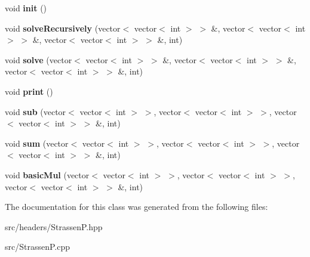 \begin{DoxyCompactItemize}
\item 
\hypertarget{classStrassenP_aecdf8438ab2f8d1cf16e184f3b0911a2}{void {\bfseries init} ()}\label{classStrassenP_aecdf8438ab2f8d1cf16e184f3b0911a2}

\item 
\hypertarget{classStrassenP_afaadbd17121fbaa8884e951a10c82fba}{void {\bfseries solve\-Recursively} (vector$<$ vector$<$ int $>$ $>$ \&, vector$<$ vector$<$ int $>$ $>$ \&, vector$<$ vector$<$ int $>$ $>$ \&, int)}\label{classStrassenP_afaadbd17121fbaa8884e951a10c82fba}

\item 
\hypertarget{classStrassenP_aa1f4f752c28183d6310fb0a18d20533a}{void {\bfseries solve} (vector$<$ vector$<$ int $>$ $>$ \&, vector$<$ vector$<$ int $>$ $>$ \&, vector$<$ vector$<$ int $>$ $>$ \&, int)}\label{classStrassenP_aa1f4f752c28183d6310fb0a18d20533a}

\item 
\hypertarget{classStrassenP_af9f8ad257710837a26afe3879ce36814}{void {\bfseries print} ()}\label{classStrassenP_af9f8ad257710837a26afe3879ce36814}

\item 
\hypertarget{classStrassenP_a61384cf91d4efda64cb12e032202a85d}{void {\bfseries sub} (vector$<$ vector$<$ int $>$ $>$, vector$<$ vector$<$ int $>$ $>$, vector$<$ vector$<$ int $>$ $>$ \&, int)}\label{classStrassenP_a61384cf91d4efda64cb12e032202a85d}

\item 
\hypertarget{classStrassenP_a71e5b5e85678d1c95c6c69861697e32c}{void {\bfseries sum} (vector$<$ vector$<$ int $>$ $>$, vector$<$ vector$<$ int $>$ $>$, vector$<$ vector$<$ int $>$ $>$ \&, int)}\label{classStrassenP_a71e5b5e85678d1c95c6c69861697e32c}

\item 
\hypertarget{classStrassenP_a36890bb07ef6299dc85e7f9cab54aab7}{void {\bfseries basic\-Mul} (vector$<$ vector$<$ int $>$ $>$, vector$<$ vector$<$ int $>$ $>$, vector$<$ vector$<$ int $>$ $>$ \&, int)}\label{classStrassenP_a36890bb07ef6299dc85e7f9cab54aab7}

\end{DoxyCompactItemize}


The documentation for this class was generated from the following files\-:\begin{DoxyCompactItemize}
\item 
src/headers/Strassen\-P.\-hpp\item 
src/Strassen\-P.\-cpp\end{DoxyCompactItemize}
